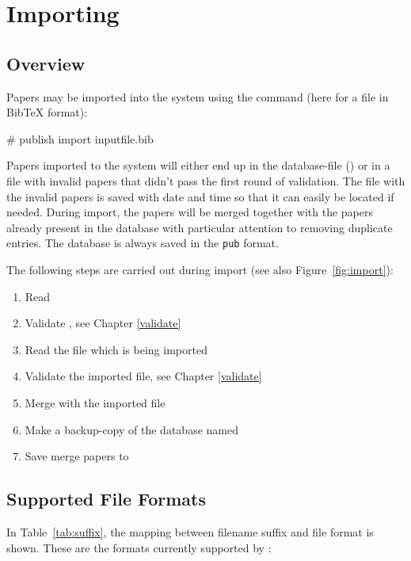 \chapter{Importing}
\label{import}

\section{Overview}

Papers may be imported into the system using the  command
(here for a file in BibTeX format):
\begin{code}
# publish import inputfile.bib
\end{code}

Papers imported to the system will either end up in the database-file
() or in a file with invalid papers that didn't pass
the first round of validation. The file with the invalid papers is
saved with date and time so that it can easily be located if needed.
During import, the papers will be merged together with the papers
already present in the database with particular attention to removing
duplicate entries.  The database is always saved in the \texttt{pub}
format.

The following steps are carried out during import (see also
Figure~\ref{fig:import}):
\begin{enumerate}
\item
  Read 
\item
  Validate , see Chapter \ref{validate}
\item
  Read the file which is being imported
\item
  Validate the imported file, see Chapter \ref{validate}
\item
  Merge  with the imported file
\item
  Make a backup-copy of the database named 
\item
  Save merge papers to 
\end{enumerate}

\section{Supported File Formats}

In Table~\ref{tab:suffix}, the mapping between filename suffix and
file format is shown. These are the formats currently supported by
\package{}:

